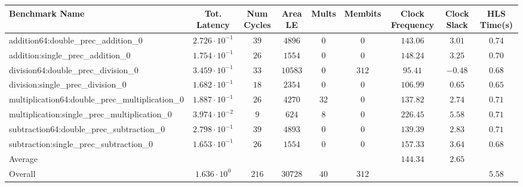 \begin{tabular}{|l|c|c|c|c|c|c|c|c|}
\hline
Benchmark Name                                   & Tot. Latency            & Num Cycles & Area LE   & Mults  & Membits & Clock Frequency & Clock Slack & HLS Time(s) \\
\hline
addition64:double\_prec\_addition\_0             & $ 2.726 \cdot 10^{-1} $ & $ 39     $ & $ 4896  $ & $ 0  $ & $ 0   $ & $ 143.06      $ & $ 3.01    $ & $ 0.74    $ \\
addition:single\_prec\_addition\_0               & $ 1.754 \cdot 10^{-1} $ & $ 26     $ & $ 1554  $ & $ 0  $ & $ 0   $ & $ 148.24      $ & $ 3.25    $ & $ 0.70    $ \\
division64:double\_prec\_division\_0             & $ 3.459 \cdot 10^{-1} $ & $ 33     $ & $ 10583 $ & $ 0  $ & $ 312 $ & $ 95.41       $ & $ -0.48   $ & $ 0.68    $ \\
division:single\_prec\_division\_0               & $ 1.682 \cdot 10^{-1} $ & $ 18     $ & $ 2354  $ & $ 0  $ & $ 0   $ & $ 106.99      $ & $ 0.65    $ & $ 0.65    $ \\
multiplication64:double\_prec\_multiplication\_0 & $ 1.887 \cdot 10^{-1} $ & $ 26     $ & $ 4270  $ & $ 32 $ & $ 0   $ & $ 137.82      $ & $ 2.74    $ & $ 0.71    $ \\
multiplication:single\_prec\_multiplication\_0   & $ 3.974 \cdot 10^{-2} $ & $ 9      $ & $ 624   $ & $ 8  $ & $ 0   $ & $ 226.45      $ & $ 5.58    $ & $ 0.71    $ \\
subtraction64:double\_prec\_subtraction\_0       & $ 2.798 \cdot 10^{-1} $ & $ 39     $ & $ 4893  $ & $ 0  $ & $ 0   $ & $ 139.39      $ & $ 2.83    $ & $ 0.71    $ \\
subtraction:single\_prec\_subtraction\_0         & $ 1.653 \cdot 10^{-1} $ & $ 26     $ & $ 1554  $ & $ 0  $ & $ 0   $ & $ 157.33      $ & $ 3.64    $ & $ 0.68    $ \\
\hline
Average                                          & $                     $ & $        $ & $       $ & $    $ & $     $ & $ 144.34      $ & $ 2.65    $ & $         $ \\
\hline
Overall                                          & $ 1.636 \cdot 10^{0}  $ & $ 216    $ & $ 30728 $ & $ 40 $ & $ 312 $ & $             $ & $         $ & $ 5.58    $ \\
\hline
\end{tabular}
